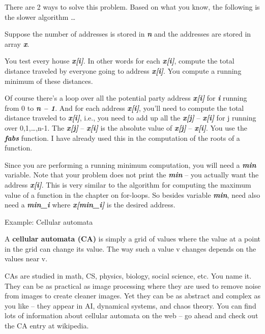 \documentclass[
]{article}
\begin{document}
There are 2 ways to solve this problem. Based on what you know, the
following is the slower algorithm \ldots{}

Suppose the number of addresses is stored in \emph{\textbf{n}} and the
addresses are stored in array \emph{\textbf{x}}.

You test every house \emph{\textbf{x{[}i{]}}}. In other words for each
\emph{\textbf{x{[}i{]}}}, compute the total distance traveled by
everyone going to address \emph{\textbf{x{[}i{]}}}. You compute a
running minimum of these distances.

Of course there's a loop over all the potential party address
\emph{\textbf{x{[}i{]}}} for \emph{\textbf{i}} running from 0 to
\emph{\textbf{n -- 1}}. And for each address \emph{\textbf{x{[}i{]}}},
you'll need to compute the total distance traveled to
\emph{\textbf{x{[}i{]}}}, i.e., you need to add up all the
\textbar{}\emph{\textbf{x{[}}\textbf{j}\textbf{{]}}} --
\emph{\textbf{x{[}i{]}}}\textbar{} for j running over 0,1,\ldots,n-1.
The \textbar{}\emph{\textbf{x{[}}\textbf{j}\textbf{{]}}} --
\emph{\textbf{x{[}i{]}}}\textbar{} is the absolute value of
\emph{\textbf{x{[}}\textbf{j}\textbf{{]}}} -- \emph{\textbf{x{[}i{]}}}.
You use the \emph{\textbf{fabs}} function. I have already used this in
the computation of the roots of a function.

Since you are performing a running minimum computation, you will need a
\emph{\textbf{min}} variable. Note that your problem does not print the
\emph{\textbf{min}} -- you actually want the address
\emph{\textbf{x{[}i{]}}}. This is very similar to the algorithm for
computing the maximum value of a function in the chapter on for-loops.
So besides variable \emph{\textbf{min}}, need also need a
\emph{\textbf{min\_i}} where \emph{\textbf{x{[}min\_i{]}}} is the
desired address.

Example: Cellular automata

A \textbf{cellular automata (CA)} is simply a grid of values where the
value at a point in the grid can change its value. The way such a value
v changes depends on the values near v.

CAs are studied in math, CS, physics, biology, social science, etc. You
name it. They can be as practical as image processing where they are
used to remove noise from images to create cleaner images. Yet they can
be as abstract and complex as you like -- they appear in AI, dynamical
systems, and chaos theory. You can find lots of information about
cellular automata on the web -- go ahead and check out the CA entry at
wikipedia.
\end{document}
